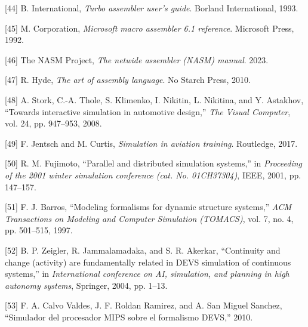 \documentclass[12pt,oneside]{templates/unerthesis}
\newcommand{\CSLLeftMargin}[1]{#1} %
\newcommand{\CSLRightInline}[1]{#1} %
\newlength{\cslhangindent}
\newenvironment{CSLReferences}[2] %
 {\setlength{\parindent}{0pt}%
  \setlength{\leftskip}{#1 pt\relax}%
  \setlength{\parskip}{#2 pt\relax}%
  \everypar{\setlength{\hangindent}{\cslhangindent}}}
 {\par}
\begin{document}
\begin{CSLReferences}{0}{0}
\leavevmode{}%
\CSLLeftMargin{{[}44{]} }%
\CSLRightInline{B. International, \emph{Turbo assembler user's guide}. Borland International, 1993.}

\leavevmode{}%
\CSLLeftMargin{{[}45{]} }%
\CSLRightInline{M. Corporation, \emph{Microsoft macro assembler 6.1 reference}. Microsoft Press, 1992.}

\leavevmode{}%
\CSLLeftMargin{{[}46{]} }%
\CSLRightInline{The NASM Project, \emph{The netwide assembler (NASM) manual}. 2023.}

\leavevmode{}%
\CSLLeftMargin{{[}47{]} }%
\CSLRightInline{R. Hyde, \emph{The art of assembly language}. No Starch Press, 2010.}

\leavevmode{}%
\CSLLeftMargin{{[}48{]} }%
\CSLRightInline{A. Stork, C.-A. Thole, S. Klimenko, I. Nikitin, L. Nikitina, and Y. Astakhov, {``Towards interactive simulation in automotive design,''} \emph{The Visual Computer}, vol. 24, pp. 947--953, 2008.}

\leavevmode{}%
\CSLLeftMargin{{[}49{]} }%
\CSLRightInline{F. Jentsch and M. Curtis, \emph{Simulation in aviation training}. Routledge, 2017.}

\leavevmode{}%
\CSLLeftMargin{{[}50{]} }%
\CSLRightInline{R. M. Fujimoto, {``Parallel and distributed simulation systems,''} in \emph{Proceeding of the 2001 winter simulation conference (cat. No. 01CH37304)}, IEEE, 2001, pp. 147--157.}

\leavevmode{}%
\CSLLeftMargin{{[}51{]} }%
\CSLRightInline{F. J. Barros, {``Modeling formalisms for dynamic structure systems,''} \emph{ACM Transactions on Modeling and Computer Simulation (TOMACS)}, vol. 7, no. 4, pp. 501--515, 1997.}

\leavevmode{}%
\CSLLeftMargin{{[}52{]} }%
\CSLRightInline{B. P. Zeigler, R. Jammalamadaka, and S. R. Akerkar, {``Continuity and change (activity) are fundamentally related in DEVS simulation of continuous systems,''} in \emph{International conference on AI, simulation, and planning in high autonomy systems}, Springer, 2004, pp. 1--13.}

\leavevmode{}%
\CSLLeftMargin{{[}53{]} }%
\CSLRightInline{F. A. Calvo Valdes, J. F. Roldan Ramirez, and A. San Miguel Sanchez, {``Simulador del procesador MIPS sobre el formalismo DEVS,''} 2010.}


\end{CSLReferences}
\end{document}
